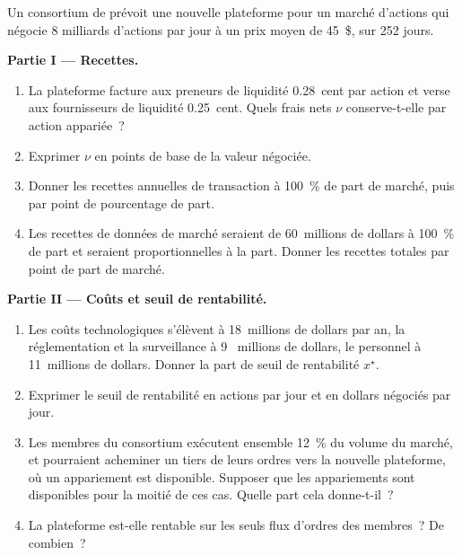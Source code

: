 \begin{problem}\label{pb:m1:exchanges-brokers-venues:1}
Un consortium de  prévoit une nouvelle plateforme pour un marché d'actions qui négocie 8
milliards d'actions par jour à un prix moyen de 45~\$, sur 252 jours.

\medskip\noindent\textbf{Partie I --- Recettes.}
\begin{enumerate}
\item La plateforme facture aux preneurs de liquidité 0.28~cent par action et verse aux fournisseurs de liquidité 0.25~cent.
Quels frais nets $\nu$ conserve-t-elle par action appariée~?
\item Exprimer $\nu$ en points de base de la valeur négociée.
\item Donner les recettes annuelles de transaction à 100~\% de part de marché, puis par
point de pourcentage de part.
\item Les recettes de données de marché seraient de 60~millions de dollars à 100~\% de part et
seraient proportionnelles à la part. Donner les recettes totales par point de part de marché.
\end{enumerate}

\medskip\noindent\textbf{Partie II --- Coûts et seuil de rentabilité.}
\begin{enumerate}[resume]
\item Les coûts technologiques s'élèvent à 18~millions de dollars par an, la réglementation et la surveillance à 9~
millions de dollars, le personnel à 11~millions de dollars. Donner la part de seuil de rentabilité $x^\star$.
\item Exprimer le seuil de rentabilité en actions par jour et en dollars négociés par jour.
\item Les membres du consortium exécutent ensemble 12~\% du volume du marché,
et pourraient acheminer un tiers de leurs ordres vers la nouvelle plateforme, où un appariement est
disponible. Supposer que les appariements sont disponibles pour la moitié de ces cas. Quelle part
cela donne-t-il~?
\item La plateforme est-elle rentable sur les seuls flux d'ordres des membres~? De combien~?
\end{enumerate}


\end{problem}
